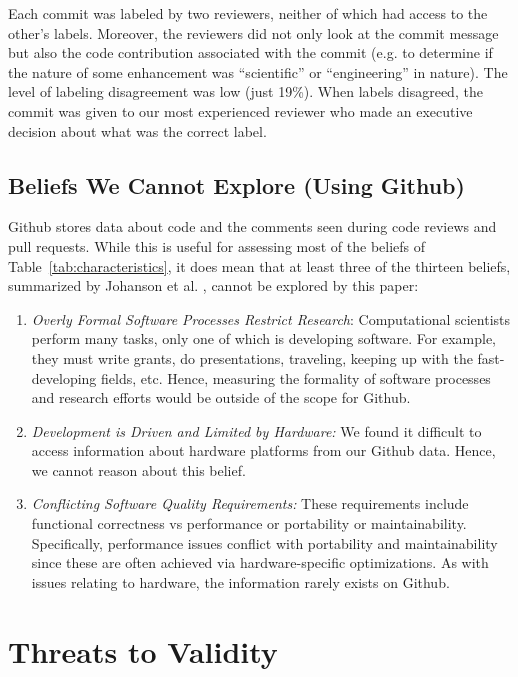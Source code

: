 \documentclass[sigconf,review,anonymous]{acmart}
\newcommand{\be}{\begin{enumerate}}
\newcommand{\ee}{\end{enumerate}}
\begin{document}
 

Each commit was labeled by two reviewers,
neither of which had access to the other's labels. Moreover, the reviewers did not only look at the commit message but also the code contribution associated with the commit (e.g. to determine if the nature of some enhancement was 
``scientific'' or ``engineering'' in nature). The level of
labeling disagreement was low (just 19\%). When labels disagreed, the commit was given to our most experienced reviewer who made an executive decision about what
was the correct label.

\subsection{Beliefs We Cannot Explore (Using Github)}

Github stores data about code and the comments seen during code reviews and pull requests. While this is useful for assessing most of the beliefs of Table~\ref{tab:characteristics}, it does mean that at least three of the thirteen beliefs, summarized by Johanson et al. \cite{johan18_secs}, cannot be explored by this paper:

\be
\item {\em Overly Formal Software Processes Restrict Research}: Computational scientists perform many tasks,
only one of which is developing software. For example,
they must write grants, do presentations, traveling, keeping up with the fast-developing fields, etc. Hence, measuring the formality of software processes and research efforts would be outside of the scope for Github.
\item {\em Development is Driven and Limited by Hardware:}
We found it difficult to access information about hardware platforms from our Github data. Hence, we cannot reason about this belief.
\item {\em Conflicting Software Quality Requirements:} These requirements include functional correctness vs
performance or portability or maintainability. Specifically, performance issues conflict with portability and maintainability since these are often achieved via hardware-specific optimizations. As with issues
relating to hardware,
the information rarely exists on Github. 
\ee




\section{Threats to Validity}
\end{document}
